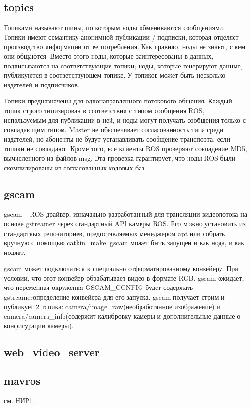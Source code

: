 \subsection{topics}
Топиками называют шины, по которым ноды обмениваются сообщениями. Топики имеют семантику анонимной публикации / подписки, которая отделяет производство информации от ее потребления. Как правило, ноды не знают, с кем они общаются. Вместо этого ноды, которые заинтересованы в данных, подписываются на соответствующие топики; ноды, которые генерируют данные, публикуются в соответствующем топике. У топиков может быть несколько издателей и подписчиков.

Топики предназначены для однонаправленного потокового общения. 
Каждый топик строго типизирован в соответствии с типом сообщения ROS, используемым для публикации в ней, и ноды могут получать сообщения только с совпадающим типом. Master не обеспечивает согласованность типа среди издателей, но абоненты не будут устанавливать сообщение транспорта, если топики не совпадают. Кроме того, все клиенты ROS проверяют совпадение MD5, вычисленного из файлов msg. Эта проверка гарантирует, что ноды ROS были скомпилированы из согласованных кодовых баз.

\subsection{gscam}
gscam -- ROS драйвер, изначально разработанный для трансляции видеопотока на основе gstreamer через стандартный API камеры ROS. Его можно установить из стандартных репозиториев, предоставляемых менеджером apt или собрать вручную с помощью catkin\_make. gscam может быть запущен и как нода, и как нодлет.

gscam может подключаться к специально отформатированному конвейеру. При условии, что этот конвейер обрабатывает видео в формате RGB. gscam ожидает, что переменная окружения GSCAM\_CONFIG будет содержать gstreamerопределение конвейера для его запуска.
gscam получает стрим и публикует 2 топика: camera/image\_raw(необработанное изображение) и camera/camera\_info(содержит калибровку камеры и дополнительные данные о конфигурации камеры).
\subsection{web\_video\_server}
\subsection{mavros}
см. НИР1.
